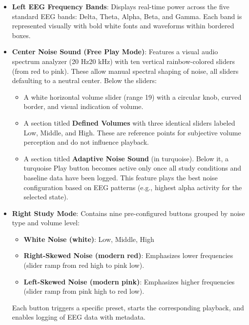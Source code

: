 \begin{itemize}
\item \textbf{Left \textendash{} EEG Frequency Bands}: Displays real-time power across the five standard EEG bands: Delta, Theta, Alpha, Beta, and Gamma. Each band is represented visually with bold white fonts and waveforms within bordered boxes.

\item \textbf{Center \textendash{} Noise Sound (Free Play Mode)}: Features a visual audio spectrum analyzer (20 Hz\textendash{}20 kHz) with ten vertical rainbow-colored sliders (from red to pink). These allow manual spectral shaping of noise, all sliders defaulting to a neutral center. Below the sliders:
\begin{itemize}
\item A white horizontal volume slider (range 1\textendash{}9) with a circular knob, curved border, and visual indication of volume.
\item A section titled \textbf{Defined Volumes} with three identical sliders labeled Low, Middle, and High. These are reference points for subjective volume perception and do not influence playback.
\item A section titled \textbf{Adaptive Noise Sound} (in turquoise). Below it, a turquoise Play button becomes active only once all study conditions and baseline data have been logged. This feature plays the best noise configuration based on EEG patterns (e.g., highest alpha activity for the selected state).
\end{itemize}

\item \textbf{Right \textendash{} Study Mode}: Contains nine pre-configured buttons grouped by noise type and volume level:
\begin{itemize}
\item \textbf{White Noise (white)}: Low, Middle, High
\item \textbf{Right-Skewed Noise (modern red)}: Emphasizes lower frequencies (slider ramp from red high to pink low).
\item \textbf{Left-Skewed Noise (modern pink)}: Emphasizes higher frequencies (slider ramp from pink high to red low).
\end{itemize}
Each button triggers a specific preset, starts the corresponding playback, and enables logging of EEG data with metadata.
\end{itemize}

